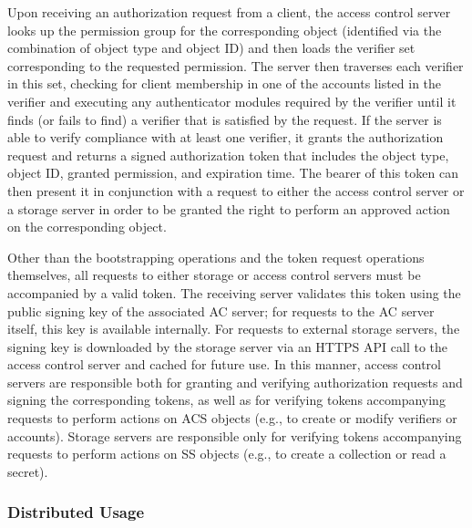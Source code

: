 Upon receiving an authorization request from a client, the access
control server looks up the permission group for the corresponding
object (identified via the combination of object type and object ID)
and then loads the verifier set corresponding to the requested
permission. The server then traverses each verifier in this set,
checking for client membership in one of the accounts listed in the
verifier and executing any authenticator modules required by the
verifier until it finds (or fails to find) a verifier that is
satisfied by the request. If the server is able to verify compliance
with at least one verifier, it grants the authorization request and
returns a signed authorization token that includes the object type,
object ID, granted permission, and expiration time. The bearer of this
token can then present it in conjunction with a request to either the
access control server or a storage server in order to be granted the
right to perform an approved action on the corresponding object.

Other than the bootstrapping operations and the token request
operations themselves, all requests to either storage or access
control servers must be accompanied by a valid token. The receiving
server validates this token using the public signing key of the
associated AC server; for requests to the AC server itself, this key
is available internally. For requests to external storage servers, the
signing key is downloaded by the storage server via an HTTPS API call
to the access control server and cached for future use. In this
manner, access control servers are responsible both for granting and
verifying authorization requests and signing the corresponding tokens,
as well as for verifying tokens accompanying requests to perform
actions on ACS objects (e.g., to create or modify verifiers or
accounts). Storage servers are responsible only for verifying tokens
accompanying requests to perform actions on SS objects (e.g., to
create a collection or read a secret).

\subsubsection{Distributed Usage}
\label{sec:tutamen:arch:distributed}

